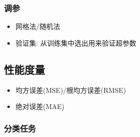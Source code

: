 \documentclass[UTF8]{article}
\begin{document}
\subsubsection{调参}
\begin{itemize}
\item 网格法/随机法
\item 验证集: 从训练集中选出用来验证超参数
\end{itemize}
\subsection{性能度量}
\begin{itemize}
\item 均方误差(MSE)/根均方误差(RMSE)
\item 绝对误差(MAE)
\end{itemize}
\subsubsection{分类任务}
\end{document}
